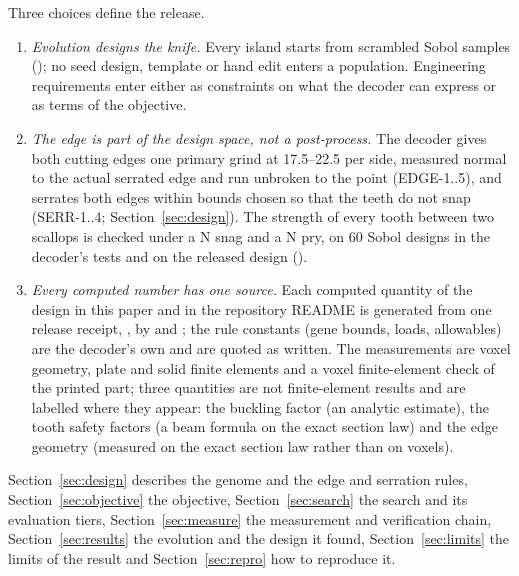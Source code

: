 Three choices define the release.
\begin{enumerate}
\item \emph{Evolution designs the knife.} Every island starts from scrambled Sobol samples
(); no seed design, template or hand edit enters a population.
Engineering requirements enter either as constraints on what the decoder can express or as terms of the objective.
\item \emph{The edge is part of the design space, not a post-process.} The decoder gives both cutting edges one primary
grind at 17.5--22.5\textdegree{} per side, measured normal to the actual serrated edge and run unbroken to the point
(EDGE-1..5), and serrates both edges within bounds chosen so that the teeth do not snap (SERR-1..4;
Section~\ref{sec:design}). The strength of every tooth between two scallops is checked under a \gToothSnag{} N snag and a
\gToothPry{} N pry, on 60 Sobol designs in the decoder's tests and on the released design
().
\item \emph{Every computed number has one source.} Each computed quantity of the design in this paper and in the
repository README is generated from one release receipt, , by
 and ; the
rule constants (gene bounds, loads, allowables) are the decoder's own and are quoted as written. The measurements are
voxel geometry, plate and solid finite elements and a voxel finite-element check of the printed part; three
quantities are not finite-element results and are labelled where they appear: the buckling factor (an analytic
estimate), the tooth safety factors (a beam formula on the exact section law) and the edge geometry (measured on the
exact section law rather than on voxels).
\end{enumerate}

Section~\ref{sec:design} describes the genome and the edge and serration rules, Section~\ref{sec:objective} the
objective, Section~\ref{sec:search} the search and its evaluation tiers, Section~\ref{sec:measure} the measurement and
verification chain, Section~\ref{sec:results} the evolution and the design it found, Section~\ref{sec:limits} the limits
of the result and Section~\ref{sec:repro} how to reproduce it.
